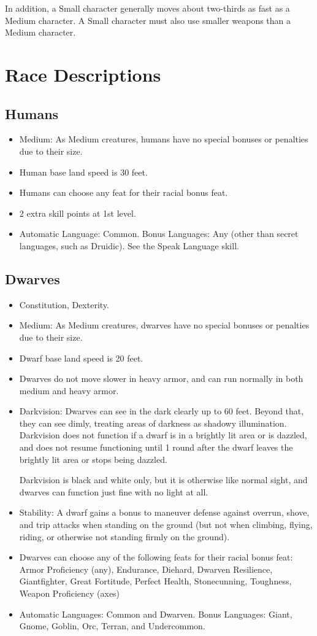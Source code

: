 In addition, a Small character generally moves about two-thirds as fast as a Medium character. A Small character must also use smaller weapons than a Medium character.

\section{Race Descriptions}

\subsection{Humans}
\begin{itemize}
\item Medium: As Medium creatures, humans have no special bonuses or penalties due to their size.
\item Human base land speed is 30 feet.
\item Humans can choose any feat for their racial bonus feat.
\item 2 extra skill points at 1st level.
\item Automatic Language: Common. Bonus Languages: Any (other than secret languages, such as Druidic). See the Speak Language skill.
\end{itemize}

\subsection{Dwarves}
\begin{itemize}
\item {} Constitution,  Dexterity.
\item Medium: As Medium creatures, dwarves have no special bonuses or penalties due to their size.
\item Dwarf base land speed is 20 feet.
\item Dwarves do not move slower in heavy armor, and can run normally in both medium and heavy armor.
\item Darkvision: Dwarves can see in the dark clearly up to 60 feet.   Beyond that, they can see dimly, treating areas of darkness as shadowy illumination. Darkvision does not function if a dwarf is in a brightly lit area or is dazzled, and does not resume functioning until 1 round after the dwarf leaves the brightly lit area or stops being dazzled.
\par Darkvision is black and white only, but it is otherwise like normal sight, and dwarves can function just fine with no light at all.
\item Stability: A dwarf gains a  bonus to maneuver defense against overrun, shove, and trip attacks when standing on the ground (but not when climbing, flying, riding, or otherwise not standing firmly on the ground).
\item Dwarves can choose any of the following feats for their racial bonus feat: Armor Proficiency (any), Endurance, Diehard, Dwarven Resilience, Giantfighter, Great Fortitude, Perfect Health, Stonecunning, Toughness, Weapon Proficiency (axes)
\item Automatic Languages: Common and Dwarven. Bonus Languages: Giant, Gnome, Goblin, Orc, Terran, and Undercommon.
\end{itemize}

